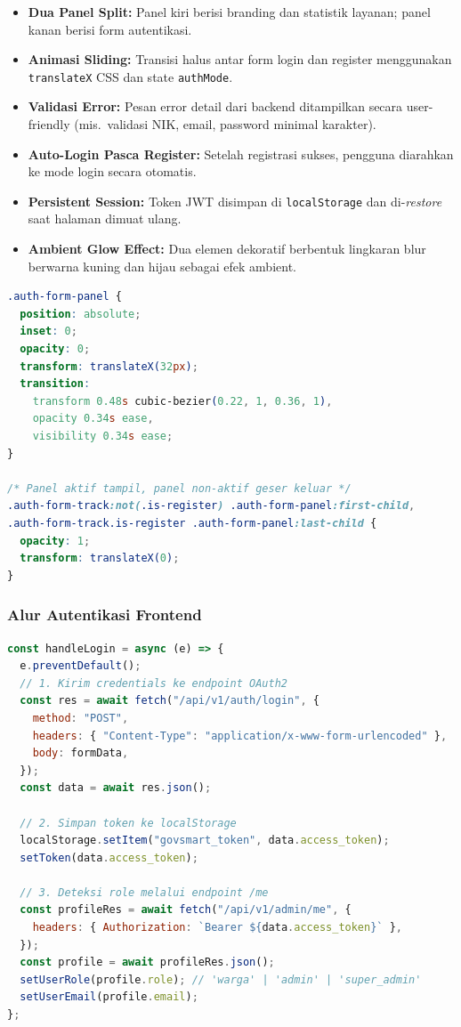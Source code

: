 \documentclass[12pt,a4paper]{article}
\begin{document}
\begin{itemize}[leftmargin=2em, itemsep=4pt]
  \item \textbf{Dua Panel Split:} Panel kiri berisi branding dan statistik layanan;
        panel kanan berisi form autentikasi.
  \item \textbf{Animasi Sliding:} Transisi halus antar form login dan register
        menggunakan \texttt{translateX} CSS dan state \texttt{authMode}.
  \item \textbf{Validasi Error:} Pesan error detail dari backend ditampilkan secara
        user-friendly (mis.\ validasi NIK, email, password minimal karakter).
  \item \textbf{Auto-Login Pasca Register:} Setelah registrasi sukses, pengguna
        diarahkan ke mode login secara otomatis.
  \item \textbf{Persistent Session:} Token JWT disimpan di \texttt{localStorage}
        dan di-\textit{restore} saat halaman dimuat ulang.
  \item \textbf{Ambient Glow Effect:} Dua elemen dekoratif berbentuk lingkaran
        blur berwarna kuning dan hijau sebagai efek ambient.
\end{itemize}

\begin{lstlisting}[language=CSS, caption=Sliding panel transition CSS]
.auth-form-panel {
  position: absolute;
  inset: 0;
  opacity: 0;
  transform: translateX(32px);
  transition:
    transform 0.48s cubic-bezier(0.22, 1, 0.36, 1),
    opacity 0.34s ease,
    visibility 0.34s ease;
}

/* Panel aktif tampil, panel non-aktif geser keluar */
.auth-form-track:not(.is-register) .auth-form-panel:first-child,
.auth-form-track.is-register .auth-form-panel:last-child {
  opacity: 1;
  transform: translateX(0);
}
\end{lstlisting}

\subsubsection{Alur Autentikasi Frontend}

\begin{lstlisting}[language=JavaScript, caption=Handler login dengan JWT dan role detection]
const handleLogin = async (e) => {
  e.preventDefault();
  // 1. Kirim credentials ke endpoint OAuth2
  const res = await fetch("/api/v1/auth/login", {
    method: "POST",
    headers: { "Content-Type": "application/x-www-form-urlencoded" },
    body: formData,
  });
  const data = await res.json();

  // 2. Simpan token ke localStorage
  localStorage.setItem("govsmart_token", data.access_token);
  setToken(data.access_token);

  // 3. Deteksi role melalui endpoint /me
  const profileRes = await fetch("/api/v1/admin/me", {
    headers: { Authorization: `Bearer ${data.access_token}` },
  });
  const profile = await profileRes.json();
  setUserRole(profile.role); // 'warga' | 'admin' | 'super_admin'
  setUserEmail(profile.email);
};
\end{lstlisting}
\end{document}
